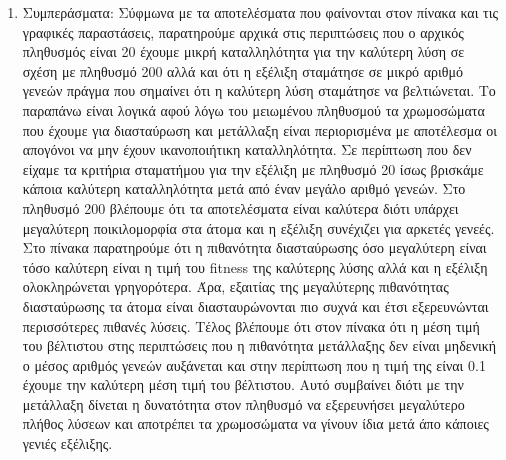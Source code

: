 \documentclass[12pt,a4paper]{article}
\newcommand{\tl}{\textlatin}
\begin{document}
\begin{enumerate}
\begin{figure}[H]
\begin{subfigure}[ht]{0.7\textwidth}
                         \caption*{Περίπτωση: 200, 0.1 ,0.01}
                     \end{subfigure}
                \end{figure} 
            \item Συμπεράσματα: 
                    Σύφμωνα με τα αποτελέσματα που 
                    φαίνονται στον πίνακα και τις γραφικές παραστάσεις, παρατηρούμε αρχικά
                    στις περιπτώσεις που ο αρχικός πληθυσμός
                    είναι 20 έχουμε  μικρή καταλληλότητα για την καλύτερη λύση
                    σε σχέση με πληθυσμό 200 αλλά και
                    ότι η εξέλιξη σταμάτησε σε μικρό αριθμό
                    γενεών πράγμα που σημαίνει ότι η καλύτερη λύση σταμάτησε να βελτιώνεται.
                    Το παραπάνω είναι λογικά αφού λόγω του μειωμένου
                    πληθυσμού τα χρωμοσώματα που έχουμε για διασταύρωση και 
                    μετάλλαξη είναι περιορισμένα με αποτέλεσμα
                    οι απογόνοι να μην έχουν ικανοποιήτικη καταλληλότητα. Σε περίπτωση 
                    που δεν είχαμε τα κριτήρια σταματήμου για
                    την εξέλιξη με πληθυσμό 20 ίσως βρισκάμε κάποια καλύτερη καταλληλότητα
                    μετά από έναν μεγάλο αριθμό γενεών. Στο
                    πληθυσμό 200 βλέπουμε ότι τα αποτελέσματα είναι καλύτερα διότι υπάρχει 
                    μεγαλύτερη ποικιλομορφία στα άτομα και η
                    εξέλιξη συνέχιζει για αρκετές γενεές.
                    Στο πίνακα παρατηρούμε ότι η πιθανότητα
                    διασταύρωσης όσο μεγαλύτερη είναι τόσο καλύτερη είναι η τιμή του
                    \tl{fitness} της καλύτερης λύσης αλλά και
                    η εξέλιξη ολοκληρώνεται γρηγορότερα. Άρα, εξαιτίας της μεγαλύτερης
                    πιθανότητας διασταύρωσης τα άτομα είναι
                    διασταυρώνονται πιο συχνά και έτσι εξερευνώνται περισσότερες πιθανές 
                    λύσεις. Τέλος βλέπουμε ότι στον πίνακα ότι
                    η μέση τιμή του βέλτιστου στης περιπτώσεις που η πιθανότητα
                    μετάλλαξης δεν είναι μηδενική ο μέσος αριθμός
                    γενεών αυξάνεται και στην περίπτωση που η τιμή της είναι 0.1
                    έχουμε την καλύτερη μέση τιμή του βέλτιστου.
                    Αυτό συμβαίνει διότι με την μετάλλαξη δίνεται η δυνατότητα στον
                    πληθυσμό να εξερευνήσει μεγαλύτερο πλήθος
                    λύσεων και αποτρέπει τα χρωμοσώματα να γίνουν ίδια μετά άπο κάποιες
                    γενιές εξέλιξης.
        \end{enumerate}
\end{document}
